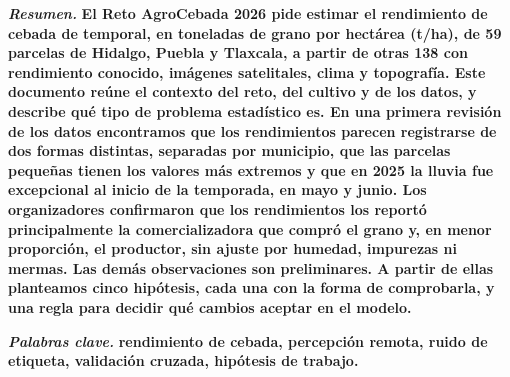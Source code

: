 \documentclass[conference,letterpaper]{IEEEtran}
\begin{document}
\noindent\textbf{\textit{Resumen.}} \bfseries El Reto AgroCebada 2026 pide estimar el rendimiento de cebada de
temporal, en toneladas de grano por hectárea (t/ha), de 59 parcelas de Hidalgo, Puebla y Tlaxcala, a partir de otras 138 con rendimiento conocido,
imágenes satelitales, clima y topografía. Este documento reúne el contexto del reto, del cultivo y de los datos, y
describe qué tipo de problema estadístico es. En una primera revisión de los datos encontramos que los rendimientos
parecen registrarse de dos formas distintas, separadas por municipio, que las parcelas pequeñas tienen los valores
más extremos y que en 2025 la lluvia fue excepcional al inicio de la temporada, en mayo y junio. Los organizadores confirmaron que los rendimientos los reportó principalmente la comercializadora que compró el grano y, en menor proporción, el productor, sin ajuste por humedad, impurezas ni mermas. Las demás observaciones son preliminares. A partir de ellas planteamos cinco hipótesis, cada una con la forma de comprobarla, y una regla para
decidir qué cambios aceptar en el modelo.\par\mdseries

\smallskip
\noindent\textbf{\textit{Palabras clave.}} \bfseries rendimiento de cebada, percepción remota, ruido de etiqueta,
validación cruzada, hipótesis de trabajo.\par\mdseries














\end{document}
